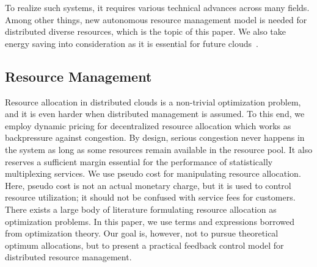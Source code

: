 To realize such systems, it requires various technical advances across
many fields.  Among other things, new autonomous resource management
model is needed for distributed diverse resources,
which is the topic of this paper.
We also take energy saving into consideration as it is
essential for future clouds~\cite{Mastelic-2015,masanet2020recalibrating}.

\subsection{Resource Management}

Resource allocation in distributed clouds is a non-trivial
optimization problem, and it is even harder when distributed
management is assumed.
To this end, we employ dynamic pricing for decentralized resource
allocation which works as backpressure against congestion.
By design, serious congestion never happens in the system as long as
some resources remain available in the resource pool.
It also reserves a sufficient margin essential for the performance of
statistically multiplexing services.
We use pseudo cost for manipulating resource allocation.
Here, pseudo cost is not an actual monetary charge, but it is used to
control resource utilization; it should not be confused with service
fees for customers.
There exists a large body of literature formulating resource allocation
as optimization problems.
In this paper, we use terms and expressions borrowed from optimization
theory. Our goal is, however, not to pursue theoretical optimum
allocations, but to present a practical feedback control model for
distributed resource management.


